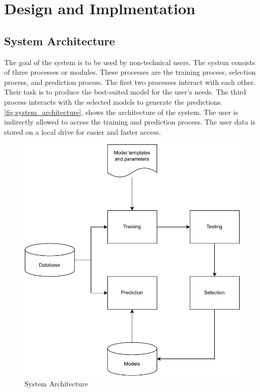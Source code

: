 \section{Design and Implmentation}\label{sec:design_and_implmentation}

\subsection{System Architecture}\label{subsec:system_architecture}

The goal of the system is to be used by non-technical users. The system consists of three processes or modules. These processes are the training process, selection process, and prediction process. The first two processes interact with each other. Their task is to produce the best-suited model for the user's needs. The third process interacts with the selected models to generate the predictions. \autoref{fig:system_architecture}, shows the architecture of the system. The user is indirectly allowed to access the training and prediction process. The user data is stored on a local drive for easier and faster access.

\begin{figure}[ht]
    \centering
    \includegraphics[width=0.9\columnwidth]{media/sec03/system_architecture.pdf}
    \caption{System Architecture}
    \label{fig:system_architecture}
\end{figure}

